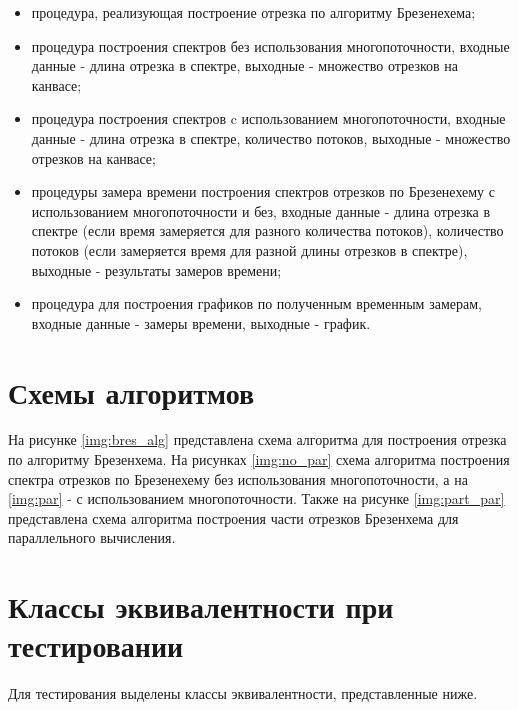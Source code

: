 \begin{itemize}
	\item процедура, реализующая построение отрезка по алгоритму Брезенехема;
	\item процедура построения спектров без использования многопоточности, входные данные - длина отрезка в спектре, выходные - множество отрезков на канвасе;
	\item процедура построения спектров c использованием многопоточности, входные данные - длина отрезка в спектре, количество потоков, выходные - множество отрезков на канвасе;
	\item процедуры замера времени построения спектров отрезков по Брезенехему с использованием многопоточности и без, входные данные - длина отрезка в спектре (если время замеряется для разного количества потоков), количество потоков (если замеряется время для разной длины отрезков в спектре), выходные - результаты замеров времени;
	\item процедура для построения графиков по полученным временным замерам, входные данные - замеры времени, выходные - график.
\end{itemize}


\section{Схемы алгоритмов}
На рисунке \ref{img:bres_alg} представлена схема алгоритма для построения отрезка по алгоритму Брезенхема. На рисунках \ref{img:no_par} схема алгоритма построения спектра отрезков по Брезенехему без использования многопоточности, а на \ref{img:par} - с использованием многопоточности. Также на рисунке \ref{img:part_par} представлена схема алгоритма построения части отрезков Брезенхема для параллельного вычисления.


\clearpage


\section{Классы эквивалентности при тестировании}

Для тестирования выделены классы эквивалентности, представленные ниже.

